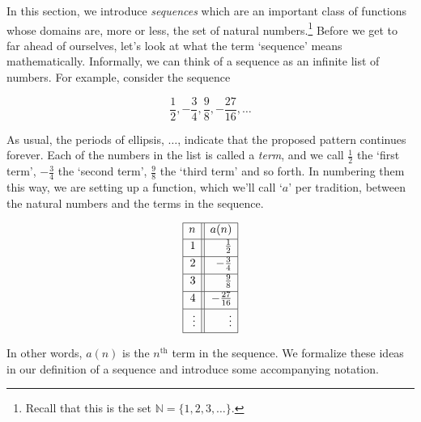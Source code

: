 \documentclass{ximera}
\begin{document}
	\author{Stitz-Zeager}




\setcounter{footnote}{0}

\label{Sequences}

In this section, we introduce \textit{sequences} which are an important class of functions whose domains are, more or less,  the set of natural numbers.\footnote{Recall that this is the set $\mathbb{N} = \{1, 2, 3, \ldots\}$.}  Before we get to far ahead of ourselves, let's look at what the term `sequence' means mathematically.  Informally, we can think of a sequence as an infinite list of numbers.  For example, consider the sequence

 \begin{equation} \label{seq1} \frac{1}{2}, -\frac{3}{4}, \frac{9}{8}, -\frac{27}{16}, \ldots \tag{1} \end{equation} 

As usual, the periods of  ellipsis, $\ldots$, indicate that the proposed pattern continues forever.  Each of the numbers in the list is called a  \textit{term}, and we call $\frac{1}{2}$ the `first term', $-\frac{3}{4}$  the `second term', $\frac{9}{8}$  the `third term' and so forth.  In numbering them this way, we are setting up a function, which we'll call `$a$' per tradition, between the natural numbers and the terms in the sequence.

\setlength{\extrarowheight}{2pt}

\[ \begin{array}{|r||r|}  \hline

n & a(n)  \\[2pt]  \hline
1  & \frac{1}{2} \\[3pt]  \hline 
2 & -\frac{3}{4}  \\[3pt] \hline 
3 & \frac{9}{8}  \\[3pt] \hline 
4 & -\frac{27}{16}  \\[3pt] \hline 
\vdots & \vdots  \\[2pt] \hline
\end{array} \] 

\setlength{\extrarowheight}{0pt}

In other words, $a(n)$ is the $n^{\text{th}}$ term in the sequence.  We formalize these ideas in our definition of a  sequence and introduce some accompanying notation.

\smallskip
\end{document}
